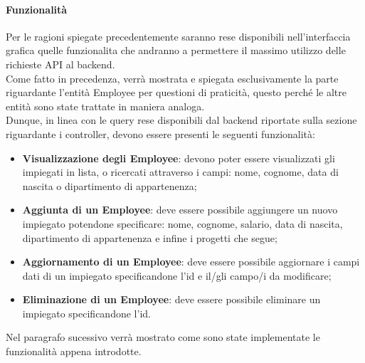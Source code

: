 \paragraph{Funzionalità}
Per le ragioni spiegate precedentemente saranno rese disponibili nell'interfaccia grafica quelle funzionalita che andranno a permettere il massimo utilizzo delle richieste API al backend.\\
Come fatto in precedenza, verrà mostrata e spiegata esclusivamente la parte riguardante l'entità Employee per questioni di praticità, questo perché le altre entità sono state trattate in maniera analoga.\\
Dunque, in linea con le query rese disponibili dal backend riportate sulla sezione riguardante i controller, devono essere presenti le seguenti funzionalità:
\begin{itemize}
  \item \textbf{Visualizzazione degli Employee}: devono poter essere visualizzati gli impiegati in lista, o ricercati attraverso i campi: nome, cognome, data di nascita o dipartimento di appartenenza;
  \item \textbf{Aggiunta di un Employee}: deve essere possibile aggiungere un nuovo impiegato potendone specificare: nome, cognome, salario, data di nascita, dipartimento di appartenenza e infine i progetti che segue;
  \item \textbf{Aggiornamento di un Employee}: deve essere possibile aggiornare i campi dati di un impiegato specificandone l'id e il/gli campo/i da modificare;
  \item \textbf{Eliminazione di un Employee}: deve essere possibile eliminare un impiegato specificandone l'id.
\end{itemize}
Nel paragrafo sucessivo verrà mostrato come sono state implementate le funzionalità appena introdotte.
